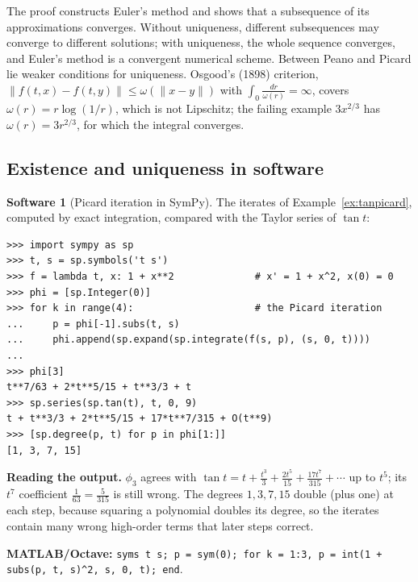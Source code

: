 \documentclass[11pt,a4paper]{article}
\numberwithin{equation}{section}
\theoremstyle{definition}
\newtheorem{software}[thm]{Software}
\begin{document}
The proof constructs Euler's method and shows that a subsequence of its approximations converges. Without uniqueness, different subsequences may converge to
different solutions; with uniqueness, the whole sequence converges, and Euler's method is a convergent numerical scheme. Between Peano and Picard lie
weaker conditions for uniqueness. Osgood's (1898) criterion, $\|f(t, x) - f(t, y)\| \leq \omega(\|x - y\|)$ with $\int_0\frac{dr}{\omega(r)} = \infty$, covers $\omega(r) = r\log(1/r)$, which is not Lipschitz; the failing
example $3x^{2/3}$ has $\omega(r) = 3r^{2/3}$, for which the integral converges.

\subsection{Existence and uniqueness in software}
\label{ssec:software2}

\begin{software}[Picard iteration in SymPy]
\label{sw:picard}
The iterates of Example~\ref{ex:tanpicard}, computed by exact integration, compared with the Taylor series of $\tan t$:
{\small\begin{verbatim}
>>> import sympy as sp
>>> t, s = sp.symbols('t s')
>>> f = lambda t, x: 1 + x**2              # x' = 1 + x^2, x(0) = 0
>>> phi = [sp.Integer(0)]
>>> for k in range(4):                     # the Picard iteration
...     p = phi[-1].subs(t, s)
...     phi.append(sp.expand(sp.integrate(f(s, p), (s, 0, t))))
...
>>> phi[3]
t**7/63 + 2*t**5/15 + t**3/3 + t
>>> sp.series(sp.tan(t), t, 0, 9)
t + t**3/3 + 2*t**5/15 + 17*t**7/315 + O(t**9)
>>> [sp.degree(p, t) for p in phi[1:]]
[1, 3, 7, 15]
\end{verbatim}}
\textbf{Reading the output.} $\phi_3$ agrees with $\tan t = t + \frac{t^3}{3} + \frac{2t^5}{15} + \frac{17t^7}{315} + \cdots$ up to $t^5$; its $t^7$ coefficient $\frac{1}{63} = \frac{5}{315}$ is still wrong. The degrees $1, 3, 7, 15$ double
(plus one) at each step, because squaring a polynomial doubles its degree, so the iterates contain many wrong high-order terms that later steps correct.

\textbf{MATLAB/Octave:} \texttt{syms t s; p = sym(0); for k = 1:3, p = int(1 + subs(p, t, s)\^{}2, s, 0, t); end}.
\end{software}
\end{document}

